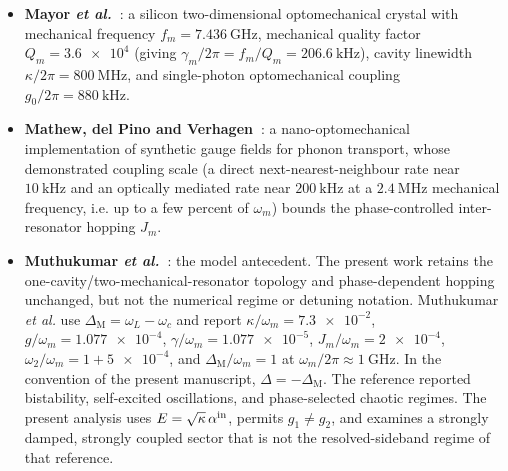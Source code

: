 \documentclass[preprint,numbers,a4paper]{elsarticle}
\begin{document}
\begin{itemize}
\item \textbf{Mayor \emph{et al.}~\cite{Mayor2025}}: a silicon two-dimensional optomechanical crystal with mechanical frequency $f_m = \qty{7.436}{\giga\hertz}$, mechanical quality factor $Q_m = \num{3.6e4}$ (giving $\gamma_m/2\pi = f_m/Q_m = \qty{206.6}{\kilo\hertz}$), cavity linewidth $\kappa/2\pi = \qty{800}{\mega\hertz}$, and single-photon optomechanical coupling $g_0/2\pi = \qty{880}{\kilo\hertz}$.
\item \textbf{Mathew, del Pino and Verhagen~\cite{Mathew2020}}: a nano-optomechanical implementation of synthetic gauge fields for phonon transport, whose demonstrated coupling scale (a direct next-nearest-neighbour rate near $\qty{10}{\kilo\hertz}$ and an optically mediated rate near $\qty{200}{\kilo\hertz}$ at a $\qty{2.4}{\mega\hertz}$ mechanical frequency, i.e. up to a few percent of $\omega_m$) bounds the phase-controlled inter-resonator hopping $J_m$.
\item \textbf{Muthukumar \emph{et al.}~\cite{muthukumar2025doi}}: the model antecedent. The present work retains the one-cavity/two-mechanical-resonator topology and phase-dependent hopping unchanged, but not the numerical regime or detuning notation. Muthukumar \emph{et al.} use $\Delta_{\mathrm M}=\omega_L-\omega_c$ and report $\kappa/\omega_m=\num{7.3e-2}$, $g/\omega_m=\num{1.077e-4}$, $\gamma/\omega_m=\num{1.077e-5}$, $J_m/\omega_m=\num{2e-4}$, $\omega_2/\omega_m=1+\num{5e-4}$, and $\Delta_{\mathrm M}/\omega_m=1$ at $\omega_m/2\pi\approx\qty{1}{\giga\hertz}$. In the convention of the present manuscript, $\Delta=-\Delta_{\mathrm M}$. The reference reported bistability, self-excited oscillations, and phase-selected chaotic regimes. The present analysis uses $E=\sqrt{\kappa}\,\alpha^{\rm in}$, permits $g_1\neq g_2$, and examines a strongly damped, strongly coupled sector that is not the resolved-sideband regime of that reference.
\end{itemize}
\end{document}
